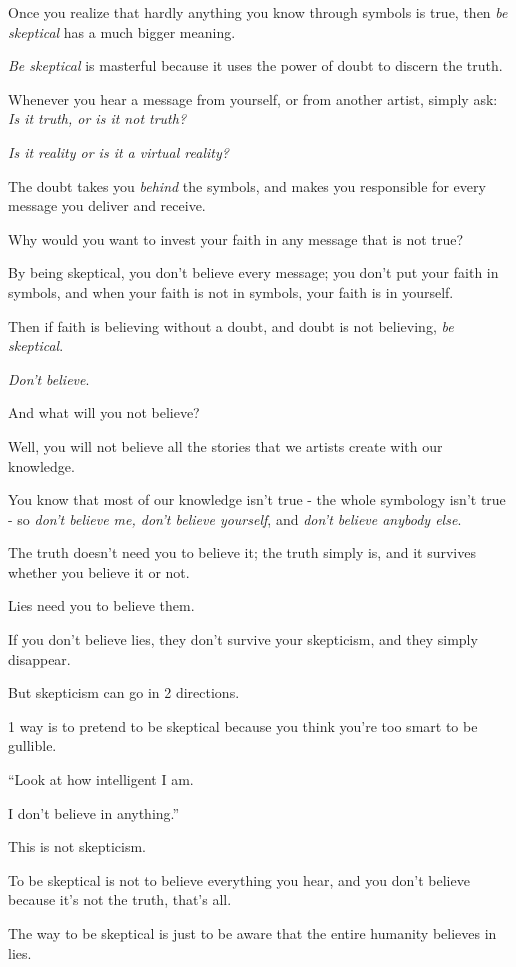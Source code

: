 \documentclass{article}
\numberwithin{equation}{section}
\begin{document}
%
Once you realize that hardly anything you know through symbols is true, then \textit{be skeptical} has a much bigger meaning.

\textit{Be skeptical} is masterful because it uses the power of doubt to discern the truth.

Whenever you hear a message from yourself, or from another artist, simply ask: \textit{Is it truth, or is it not truth?}

\textit{Is it reality or is it a virtual reality?}

The doubt takes you \textit{behind} the symbols, and makes you responsible for every message you deliver and receive.

Why would you want to invest your faith in any message that is not true?

By being skeptical, you don't believe every message; you don't put your faith in symbols, and when your faith is not in symbols, your faith is in yourself.

%
Then if faith is believing without a doubt, and doubt is not believing, \textit{be skeptical}.

\textit{Don't believe}.

And what will you not believe?

Well, you will not believe all the stories that we artists create with our knowledge.

You know that most of our knowledge isn't true - the whole symbology isn't true - so \textit{don't believe me, don't believe yourself}, and \textit{don't believe anybody else}.

The truth doesn't need you to believe it; the truth simply is, and it survives whether you believe it or not.

Lies need you to believe them.

If you don't believe lies, they don't survive your skepticism, and they simply disappear.

%
But skepticism can go in 2 directions.

1 way is to pretend to be skeptical because you think you're too smart to be gullible.

``Look at how intelligent I am.

I don't believe in anything.''

This is not skepticism.

To be skeptical is not to believe everything you hear, and you don't believe because it's not the truth, that's all.

The way to be skeptical is just to be aware that the entire humanity believes in lies.
\end{document}
